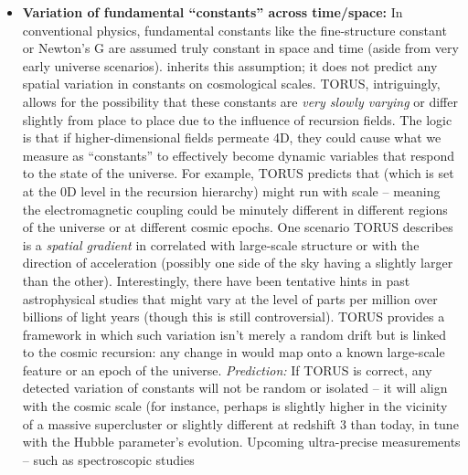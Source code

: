 \documentclass[
]{article}
\begin{document}
{\begin{itemize}
  index. Any such finding -- if it matches TORUS's specific pattern (for
  instance, a modulation at the recursion scale) -- would be a win for
  TORUS. If, on the other hand, structure growth perfectly matches a
  \LambdaCDM universe with cold dark matter and a cosmological constant at all
  scales, that would constrain the allowable strength of any recursion
  effects strongly.
\item
  \textbf{Variation of fundamental ``constants'' across time/space:} In
  conventional physics, fundamental constants like the fine-structure
  constant \alpha or Newton's G are assumed truly constant in space and time
  (aside from very early universe scenarios). \LambdaCDM inherits this
  assumption; it does not predict any spatial variation in constants on
  cosmological scales. TORUS, intriguingly, allows for the possibility
  that these constants are \emph{very slowly varying} or differ slightly
  from place to place due to the influence of recursion fields. The
  logic is that if higher-dimensional fields permeate 4D, they could
  cause what we measure as ``constants'' to effectively become dynamic
  variables that respond to the state of the universe. For example,
  TORUS predicts that \alpha (which is set at the 0D level in the recursion
  hierarchy) might run with scale -- meaning the electromagnetic
  coupling could be minutely different in different regions of the
  universe or at different cosmic epochs\hspace{0pt}. One scenario TORUS
  describes is a \emph{spatial gradient} in \alpha correlated with
  large-scale structure or with the direction of acceleration (possibly
  one side of the sky having a slightly larger \alpha than the
  other)\hspace{0pt}. Interestingly, there have been tentative hints in
  past astrophysical studies that \alpha might vary at the level of parts per
  million over billions of light years (though this is still
  controversial). TORUS provides a framework in which such variation
  isn't merely a random drift but is linked to the cosmic recursion: any
  change in \alpha would map onto a known large-scale feature or an epoch of
  the universe. \emph{Prediction:} If TORUS is correct, any detected
  variation of constants will not be random or isolated -- it will align
  with the cosmic scale (for instance, perhaps \alpha is slightly higher in
  the vicinity of a massive supercluster or slightly different at
  redshift 3 than today, in tune with the Hubble parameter's evolution.
  Upcoming ultra-precise measurements -- such as spectroscopic studies

\end{itemize}}
\end{document}
